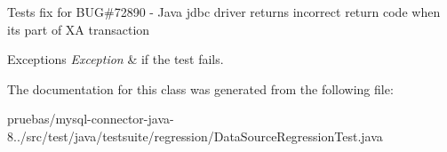 Tests fix for B\+UG\#72890 -\/ Java jdbc driver returns incorrect return code when it\textquotesingle{}s part of XA transaction


\begin{DoxyExceptions}{Exceptions}
{\em Exception} & if the test fails. \\
\hline
\end{DoxyExceptions}


The documentation for this class was generated from the following file\+:\begin{DoxyCompactItemize}
\item 
pruebas/mysql-\/connector-\/java-\/8../src/test/java/testsuite/regression/Data\+Source\+Regression\+Test.\+java\end{DoxyCompactItemize}
